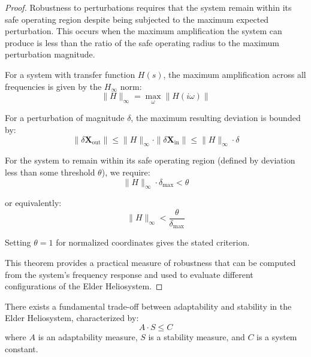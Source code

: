 \begin{proof}
Robustness to perturbations requires that the system remain within its safe operating region despite being subjected to the maximum expected perturbation. This occurs when the maximum amplification the system can produce is less than the ratio of the safe operating radius to the maximum perturbation magnitude.

For a system with transfer function $H(s)$, the maximum amplification across all frequencies is given by the $H_{\infty}$ norm:
\begin{equation}
\|H\|_{\infty} = \max_{\omega} \| H(i\omega) \|
\end{equation}

For a perturbation of magnitude $\delta$, the maximum resulting deviation is bounded by:
\begin{equation}
\|\delta\mathbf{X}_{\text{out}}\| \leq \|H\|_{\infty} \cdot \|\delta\mathbf{X}_{\text{in}}\| \leq \|H\|_{\infty} \cdot \delta
\end{equation}

For the system to remain within its safe operating region (defined by deviation less than some threshold $\theta$), we require:
\begin{equation}
\|H\|_{\infty} \cdot \delta_{\text{max}} < \theta
\end{equation}

or equivalently:
\begin{equation}
\|H\|_{\infty} < \frac{\theta}{\delta_{\text{max}}}
\end{equation}

Setting $\theta = 1$ for normalized coordinates gives the stated criterion.

This theorem provides a practical measure of robustness that can be computed from the system's frequency response and used to evaluate different configurations of the Elder Heliosystem.
\end{proof}

\begin{theorem}
There exists a fundamental trade-off between adaptability and stability in the Elder Heliosystem, characterized by:
\begin{equation}
A \cdot S \leq C
\end{equation}
where $A$ is an adaptability measure, $S$ is a stability measure, and $C$ is a system constant.
\end{theorem}


